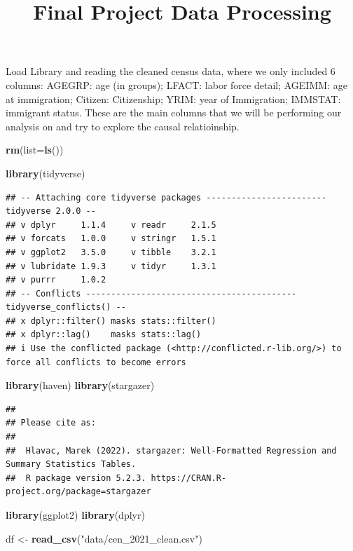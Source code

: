 \documentclass[
]{article}
\title{Final Project Data Processing}
\author{}
\date{\vspace{-2.5em}}
\newenvironment{Shaded}{\begin{snugshade}}{\end{snugshade}}
\newcommand{\AttributeTok}[1]{\textcolor[rgb]{0.13,0.29,0.53}{#1}}
\newcommand{\FunctionTok}[1]{\textcolor[rgb]{0.13,0.29,0.53}{\textbf{#1}}}
\newcommand{\NormalTok}[1]{#1}
\newcommand{\OtherTok}[1]{\textcolor[rgb]{0.56,0.35,0.01}{#1}}
\newcommand{\StringTok}[1]{\textcolor[rgb]{0.31,0.60,0.02}{#1}}
\begin{document}
\maketitle

Load Library and reading the cleaned census data, where we only included
6 columns: AGEGRP: age (in groups); LFACT: labor force detail; AGEIMM:
age at immigration; Citizen: Citizenship; YRIM: year of Immigration;
IMMSTAT: immigrant status. These are the main columns that we will be
performing our analysis on and try to explore the causal relatioinship.

\begin{Shaded}
\begin{Highlighting}[]
\FunctionTok{rm}\NormalTok{(}\AttributeTok{list=}\FunctionTok{ls}\NormalTok{())}

\FunctionTok{library}\NormalTok{(tidyverse)}
\end{Highlighting}
\end{Shaded}

\begin{verbatim}
## -- Attaching core tidyverse packages ------------------------ tidyverse 2.0.0 --
## v dplyr     1.1.4     v readr     2.1.5
## v forcats   1.0.0     v stringr   1.5.1
## v ggplot2   3.5.0     v tibble    3.2.1
## v lubridate 1.9.3     v tidyr     1.3.1
## v purrr     1.0.2     
## -- Conflicts ------------------------------------------ tidyverse_conflicts() --
## x dplyr::filter() masks stats::filter()
## x dplyr::lag()    masks stats::lag()
## i Use the conflicted package (<http://conflicted.r-lib.org/>) to force all conflicts to become errors
\end{verbatim}

\begin{Shaded}
\begin{Highlighting}[]
\FunctionTok{library}\NormalTok{(haven)}
\FunctionTok{library}\NormalTok{(stargazer)}
\end{Highlighting}
\end{Shaded}

\begin{verbatim}
## 
## Please cite as: 
## 
##  Hlavac, Marek (2022). stargazer: Well-Formatted Regression and Summary Statistics Tables.
##  R package version 5.2.3. https://CRAN.R-project.org/package=stargazer
\end{verbatim}

\begin{Shaded}
\begin{Highlighting}[]
\FunctionTok{library}\NormalTok{(ggplot2)}
\FunctionTok{library}\NormalTok{(dplyr)}

\NormalTok{df }\OtherTok{\textless{}{-}} \FunctionTok{read\_csv}\NormalTok{(}\StringTok{"data/cen\_2021\_clean.csv"}\NormalTok{)}
\end{Highlighting}
\end{Shaded}
\end{document}
